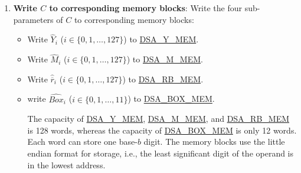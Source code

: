 \documentclass[main\_\_EN.tex]{subfiles}
\begin{document}
\begin{enumerate}
    \item {\bfseries Write \begin{math}C\end{math} to corresponding memory blocks}: Write the four sub-parameters of \begin{math}C\end{math} to corresponding memory blocks:
    \begin{itemize}
        \item Write \begin{math}\widehat{Y}_{i}\end{math}
        (\begin{math}i \in \{ 0, 1, \dots, 127 \} \end{math})
        to \hyperref[DSAYMEM]{DSA\_Y\_MEM}.

        \item Write \begin{math}\widehat{M}_{i}\end{math}
        (\begin{math}i \in \{ 0, 1, \dots, 127 \} \end{math})
        to \hyperref[DSAMMEM]{DSA\_M\_MEM}.

        \item Write \begin{math}\widehat{\overline{r}}_{i}\end{math}
        (\begin{math}i \in \{ 0, 1, \dots, 127 \} \end{math})
        to \hyperref[DSARBMEM]{DSA\_RB\_MEM}.

        \item write \begin{math}\widehat{Box}_{i}\end{math}
        (\begin{math}i \in \{ 0, 1, \dots, 11 \} \end{math})
        to \hyperref[DSABOXMEM]{DSA\_BOX\_MEM}.

        The capacity of
        \hyperref[DSAYMEM]{DSA\_Y\_MEM},
        \hyperref[DSAMMEM]{DSA\_M\_MEM}, and
        \hyperref[DSARBMEM]{DSA\_RB\_MEM} is 128 words, whereas the capacity of
        \hyperref[DSABOXMEM]{DSA\_BOX\_MEM} is only 12 words.
        Each word can store one base-\begin{math}b\end{math} digit. The memory blocks use the little endian format for storage, i.e., the least significant digit of the operand is in the lowest address.


\end{itemize}
\end{enumerate}
\end{document}
